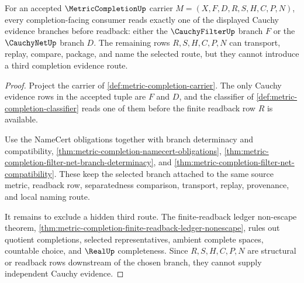 \begin{theorem}
\label{thm:metric-completion-filter-net-branch-exhaustion}
For an accepted $\MetricCompletionUp$ carrier $M=(X,F,D,R,S,H,C,P,N)$, every completion-facing consumer reads exactly one of the displayed Cauchy evidence branches before readback: either the $\CauchyFilterUp$ branch $F$ or the $\CauchyNetUp$ branch $D$. The remaining rows $R,S,H,C,P,N$ can transport, replay, compare, package, and name the selected route, but they cannot introduce a third completion evidence route.
\end{theorem}
\begin{proof}
Project the carrier of \autoref{def:metric-completion-carrier}. The only Cauchy evidence rows in the accepted tuple are $F$ and $D$, and the classifier of \autoref{def:metric-completion-classifier} reads one of them before the finite readback row $R$ is available.

Use the NameCert obligations together with branch determinacy and compatibility, \autoref{thm:metric-completion-namecert-obligations}, \autoref{thm:metric-completion-filter-net-branch-determinacy}, and \autoref{thm:metric-completion-filter-net-compatibility}. These keep the selected branch attached to the same source metric, readback row, separatedness comparison, transport, replay, provenance, and local naming route.

It remains to exclude a hidden third route. The finite-readback ledger non-escape theorem, \autoref{thm:metric-completion-finite-readback-ledger-nonescape}, rules out quotient completions, selected representatives, ambient complete spaces, countable choice, and $\RealUp$ completeness. Since $R,S,H,C,P,N$ are structural or readback rows downstream of the chosen branch, they cannot supply independent Cauchy evidence.
\end{proof}

